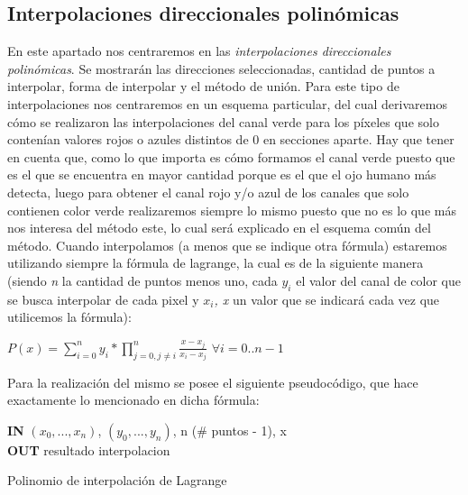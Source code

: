 \documentclass[10pt, a4paper]{article}
\begin{document}
\subsection{Interpolaciones direccionales polin\'omicas}

En este apartado nos centraremos en las \textit{interpolaciones direccionales polin\'omicas}. Se mostrar\'an las direcciones seleccionadas, cantidad de puntos a interpolar, forma de interpolar y el m\'etodo de uni\'on. Para este tipo de interpolaciones nos centraremos en un esquema particular, del cual derivaremos c\'omo se realizaron las interpolaciones del canal verde para los p\'ixeles que solo conten\'ian valores rojos o azules distintos de 0 en secciones aparte. Hay que tener en cuenta que, como lo que importa es c\'omo formamos el canal verde puesto que es el que se encuentra en mayor cantidad porque es el que el ojo humano m\'as detecta, luego para obtener el canal rojo y/o azul de los canales que solo contienen color verde realizaremos siempre lo mismo puesto que no es lo que m\'as nos interesa del m\'etodo este, lo cual ser\'a explicado en el esquema com\'un del m\'etodo. Cuando interpolamos (a menos que se indique otra f\'ormula) estaremos utilizando siempre la f\'ormula de lagrange, la cual es de la siguiente manera (siendo \textit{n} la cantidad de puntos menos uno, cada \textit{$y_{i}$} el valor del canal de color que se busca interpolar de cada pixel y \textit{$x_{i}$, x} un valor que se indicar\'a cada vez que utilicemos la f\'ormula):
\begin{center}
$P(x) = \sum_{i=0}^{n}y_{i}*\prod_{j=0,{j \neq i}}^{n}\frac{x-x_{j}}{x_{i}-x_{j}}$  $\forall i=0..n-1$\\
\end{center}
Para la realizaci\'on del mismo se posee el siguiente pseudoc\'odigo, que hace exactamente lo mencionado en dicha f\'ormula:

\vspace{0.5cm}
\begin{algorithm}[H]
\textbf{IN} $(x_{0},...,x_{n})$, $(y_{0},...,y_{n})$, n (\# puntos - 1), x  \\
\textbf{OUT} resultado interpolacion \\
\caption{Polinomio de interpolaci\'on de Lagrange}
\end{algorithm}
\end{document}
